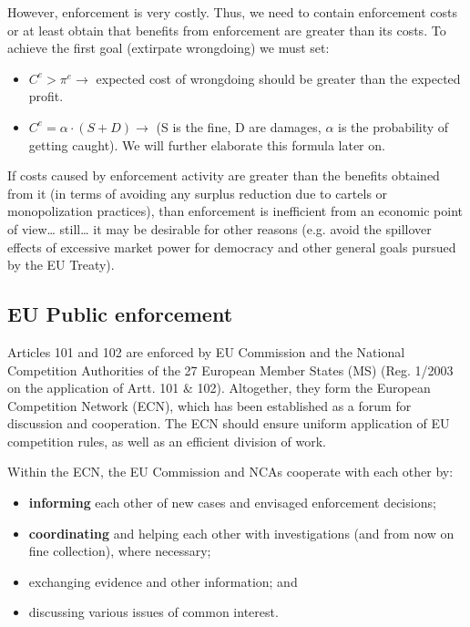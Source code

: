         However, enforcement is very costly. Thus, we need to contain enforcement costs or at least obtain that benefits from enforcement are greater than its costs. To achieve the first goal (extirpate wrongdoing) we must set:
    
        \begin{itemize}
            \item \(C^e > \pi^e \rightarrow \) expected cost of wrongdoing should be greater than the expected profit.
            \item \( C^e = \alpha \cdot (S+D) \rightarrow \) (S is the fine, D are damages, \(\alpha\) is the probability of getting caught). We will further elaborate this formula later on.
        \end{itemize}

        If costs caused by enforcement activity are greater than the benefits obtained from it (in terms of avoiding any surplus reduction due to cartels or monopolization practices), than enforcement is inefficient from an economic point of view… still… it may be desirable for other reasons (e.g. avoid the spillover effects of excessive market power for democracy and other general goals pursued by the EU Treaty).

    \subsection{EU Public enforcement}

        Articles 101 and 102 are enforced by EU Commission and the National Competition Authorities of the 27 European Member States (MS) (Reg. 1/2003 on the application of Artt. 101 \& 102). Altogether, they form the European Competition Network (ECN), which has been established as a forum for discussion and cooperation. The ECN should ensure uniform application of EU competition rules, as well as an efficient division of work. 
        
        Within the ECN, the EU Commission and NCAs cooperate with each other by:

        \begin{itemize}
            \item \textbf{informing} each other of new cases and envisaged enforcement decisions;
            \item \textbf{coordinating} and helping each other with investigations (and from now on fine collection), where necessary;
            \item exchanging evidence and other information; and
            \item discussing various issues of common interest.
        \end{itemize}

